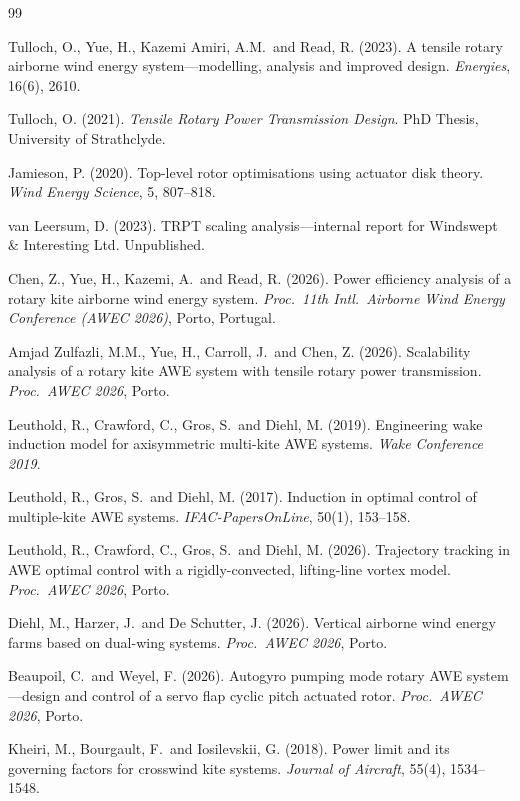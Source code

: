 \documentclass[11pt,a4paper]{article}
\begin{document}
\begin{thebibliography}{99}

Tulloch, O., Yue, H., Kazemi Amiri, A.M.\ and Read, R. (2023).
A tensile rotary airborne wind energy system---modelling, analysis and improved design.
\emph{Energies}, 16(6), 2610.

Tulloch, O. (2021).
\emph{Tensile Rotary Power Transmission Design}.
PhD Thesis, University of Strathclyde.

Jamieson, P. (2020).
Top-level rotor optimisations using actuator disk theory.
\emph{Wind Energy Science}, 5, 807--818.

van Leersum, D. (2023).
TRPT scaling analysis---internal report for Windswept \& Interesting Ltd.
Unpublished.

Chen, Z., Yue, H., Kazemi, A.\ and Read, R. (2026).
Power efficiency analysis of a rotary kite airborne wind energy system.
\emph{Proc.\ 11th Intl.\ Airborne Wind Energy Conference (AWEC 2026)}, Porto, Portugal.

Amjad Zulfazli, M.M., Yue, H., Carroll, J.\ and Chen, Z. (2026).
Scalability analysis of a rotary kite AWE system with tensile rotary power transmission.
\emph{Proc.\ AWEC 2026}, Porto.

Leuthold, R., Crawford, C., Gros, S.\ and Diehl, M. (2019).
Engineering wake induction model for axisymmetric multi-kite AWE systems.
\emph{Wake Conference 2019}.

Leuthold, R., Gros, S.\ and Diehl, M. (2017).
Induction in optimal control of multiple-kite AWE systems.
\emph{IFAC-PapersOnLine}, 50(1), 153--158.

Leuthold, R., Crawford, C., Gros, S.\ and Diehl, M. (2026).
Trajectory tracking in AWE optimal control with a rigidly-convected, lifting-line vortex model.
\emph{Proc.\ AWEC 2026}, Porto.

Diehl, M., Harzer, J.\ and De Schutter, J. (2026).
Vertical airborne wind energy farms based on dual-wing systems.
\emph{Proc.\ AWEC 2026}, Porto.

Beaupoil, C.\ and Weyel, F. (2026).
Autogyro pumping mode rotary AWE system---design and control of a servo flap cyclic pitch actuated rotor.
\emph{Proc.\ AWEC 2026}, Porto.

Kheiri, M., Bourgault, F.\ and Iosilevskii, G. (2018).
Power limit and its governing factors for crosswind kite systems.
\emph{Journal of Aircraft}, 55(4), 1534--1548.


\end{thebibliography}
\end{document}
